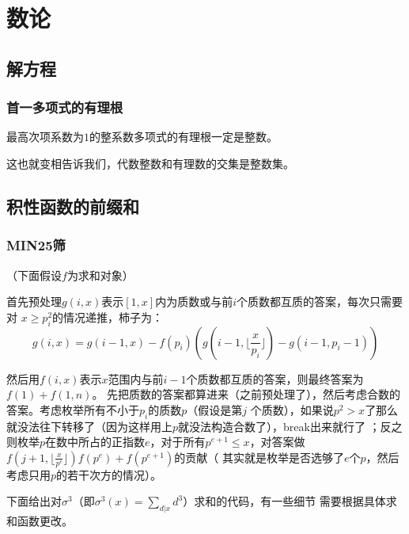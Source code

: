\chapter{数论}

\section{解方程}
\subsection{首一多项式的有理根}
最高次项系数为$1$的整系数多项式的有理根一定是整数。\par
这也就变相告诉我们，代数整数和有理数的交集是整数集。

\section{积性函数的前缀和}
\subsection{MIN25筛}
（下面假设$f$为求和对象）\par
首先预处理$g(i, x)$表示$[1, x]$内为质数或与前$i$个质数都互质的答案，每次只需要对
$x\geq p_i^2$的情况递推，柿子为：
\[g(i, x) = g(i - 1, x) - f(p_i)(g(i - 1,\lfloor\frac{x}{p_i}\rfloor) - g(i - 1, p_i - 1))\]\par
然后用$f(i, x)$表示$x$范围内与前$i-1$个质数都互质的答案，则最终答案为$f(1)+f(1, n)$。
先把质数的答案都算进来（之前预处理了），然后考虑合数的答案。考虑枚举所有不小于$p_i$的质数$p$（假设是第$j$
个质数），如果说$p^2>x$了那么就没法往下转移了（因为这样用上$p$就没法构造合数了），break出来就行了
；反之则枚举$p$在数中所占的正指数$e$，对于所有$p^{e+1}\leq x$，对答案做
$f(j + 1, \lfloor\frac{x}{p^e}\rfloor)f(p^e) + f(p^{e + 1})$的贡献（
其实就是枚举是否选够了$e$个$p$，然后考虑只用$p$的若干次方的情况）。\par
下面给出对$\sigma^3$（即$\sigma^3(x) = \sum_{d | x}d^3$）求和的代码，有一些细节
需要根据具体求和函数更改。
